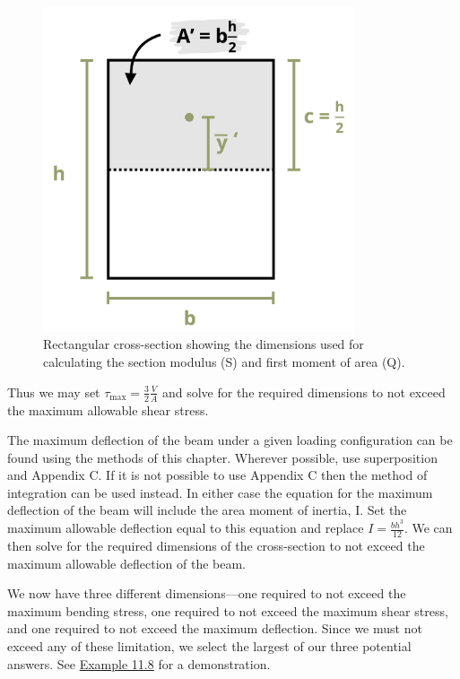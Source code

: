 \documentclass[
  letterpaper,
  DIV=11,
  numbers=noendperiod]{scrreprt}
\begin{document}
\begin{figure}

{\centering \includegraphics[width=3.60417in,height=\textheight]{images/CH11 PNGs/11.8.png}

}

\caption{Rectangular cross-section showing the dimensions used for
calculating the section modulus (S) and first moment of area (Q).}

\end{figure}%

Thus we may set \(\tau_{\max }=\frac{3}{2} \frac{V}{A}\) and solve for
the required dimensions to not exceed the maximum allowable shear
stress.

The maximum deflection of the beam under a given loading configuration
can be found using the methods of this chapter. Wherever possible, use
superposition and Appendix C. If it is not possible to use Appendix C
then the method of integration can be used instead. In either case the
equation for the maximum deflection of the beam will include the area
moment of inertia, I. Set the maximum allowable deflection equal to this
equation and replace \(I=\frac{b h^{3}}{12}\). We can then solve for the
required dimensions of the cross-section to not exceed the maximum
allowable deflection of the beam.

We now have three different dimensions---one required to not exceed the
maximum bending stress, one required to not exceed the maximum shear
stress, and one required to not exceed the maximum deflection. Since we
must not exceed any of these limitation, we select the largest of our
three potential answers. See \hyperref[example-11.8]{Example 11.8} for a
demonstration.
\end{document}
